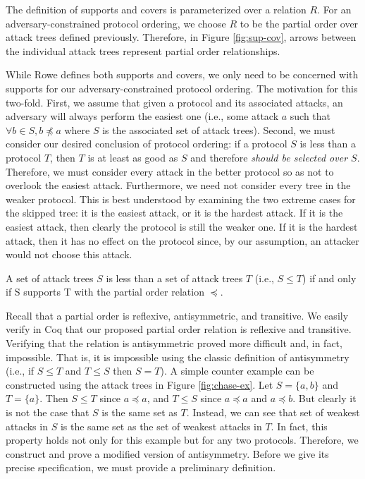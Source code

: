 \documentclass[runningheads]{llncs}
\theoremstyle{definition}
\begin{document}
The definition of supports and covers is parameterized over a relation $R$. For an adversary-constrained protocol ordering, we choose $R$ to be the partial order over attack trees defined previously. Therefore, in Figure \ref{fig:sup-cov}, arrows between the individual attack trees represent partial order relationships.

While Rowe defines both supports and covers, we only need to be concerned with supports for our adversary-constrained protocol ordering. The motivation for this two-fold. First, we assume that given a protocol and its associated attacks, an adversary will always perform the easiest one (i.e., some attack $a$ such that $\forall b \in S, b \npreceq a$ where $S$ is the associated set of attack trees). Second, we must consider our desired conclusion of protocol ordering: if a protocol $S$ is less than a protocol $T$, then $T$ is at least as good as $S$ and therefore \emph{should be selected over $S$}. Therefore, we must consider every attack in the better protocol so as not to overlook the easiest attack. Furthermore, we need not consider every tree in the weaker protocol. This is best understood by examining the two extreme cases for the skipped tree: it is the easiest attack, or it is the hardest attack. If it is the easiest attack, then clearly the protocol is still the weaker one. If it is the hardest attack, then it has no effect on the protocol since, by our assumption, an attacker would not choose this attack.

\begin{definition}
  A set of attack trees $S$ is less than a set of attack trees $T$ (i.e., $S \leq T$) if and only if S supports T with the partial order relation $\preceq$.
\end{definition} 

Recall that a partial order is reflexive, antisymmetric, and transitive. We easily verify in Coq that our proposed partial order relation is reflexive and transitive. Verifying that the relation is antisymmetric proved more difficult and, in fact, impossible. That is, it is impossible using the classic definition of antisymmetry (i.e., if $S \le T$ and $T \le S$ then $S = T$). A simple counter example can be constructed using the attack trees in Figure \ref{fig:chase-ex}. Let $S = \{a,b\}$ and $T = \{a\}$. Then $S \le T$ since $a \preceq a$, and $T \le S$ since $a \preceq a$ and $a \preceq b$. But clearly it is not the case that $S$ is the same set as $T$. Instead, we can see that set of weakest attacks in $S$ is the same set as the set of weakest attacks in $T$. In fact, this property holds not only for this example but for any two protocols. Therefore, we construct and prove a modified version of antisymmetry. Before we give its precise specification, we must provide a preliminary definition.
\end{document}
